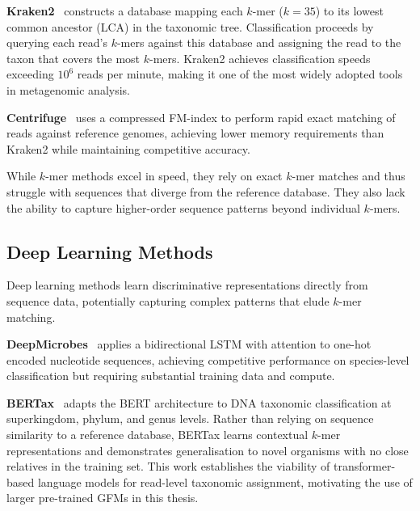 \textbf{Kraken2}~\cite{Wood2019} constructs a database mapping each $k$-mer ($k=35$) to its lowest common ancestor (LCA) in the taxonomic tree. Classification proceeds by querying each read's $k$-mers against this database and assigning the read to the taxon that covers the most $k$-mers. Kraken2 achieves classification speeds exceeding $10^6$ reads per minute, making it one of the most widely adopted tools in metagenomic analysis.

\textbf{Centrifuge}~\cite{Kim2016} uses a compressed FM-index to perform rapid exact matching of reads against reference genomes, achieving lower memory requirements than Kraken2 while maintaining competitive accuracy.

While $k$-mer methods excel in speed, they rely on exact $k$-mer matches and thus struggle with sequences that diverge from the reference database. They also lack the ability to capture higher-order sequence patterns beyond individual $k$-mers.

\subsection{Deep Learning Methods}

Deep learning methods learn discriminative representations directly from sequence data, potentially capturing complex patterns that elude $k$-mer matching.

\textbf{DeepMicrobes}~\cite{Liang2020} applies a bidirectional LSTM with attention to one-hot encoded nucleotide sequences, achieving competitive performance on species-level classification but requiring substantial training data and compute.

\textbf{BERTax}~\cite{Mock2022bertax} adapts the BERT architecture to DNA taxonomic classification at superkingdom, phylum, and genus levels. Rather than relying on sequence similarity to a reference database, BERTax learns contextual $k$-mer representations and demonstrates generalisation to novel organisms with no close relatives in the training set. This work establishes the viability of transformer-based language models for read-level taxonomic assignment, motivating the use of larger pre-trained GFMs in this thesis.

